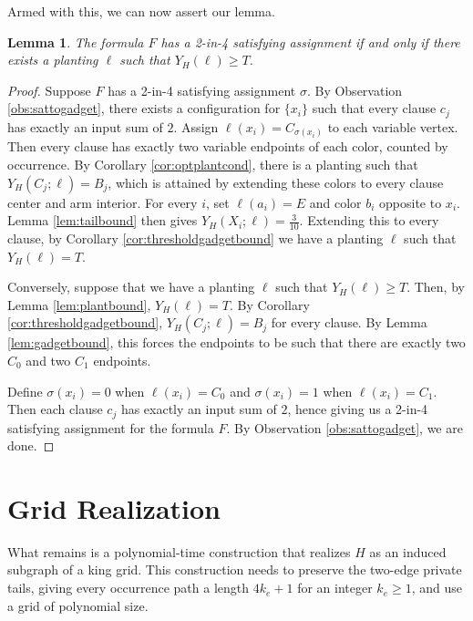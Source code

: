 \documentclass[11pt]{article}
\theoremstyle{plain}
\newtheorem{lemma}[theorem]{Lemma}
\begin{document}
Armed with this, we can now assert our lemma.

\begin{lemma} \label{lem:equivalence}
    The formula $F$ has a 2-in-4 satisfying assignment if and only if there exists a planting $\ell$ such that $Y_H(\ell) \geq T$. 
\end{lemma}

\begin{proof}
    Suppose $F$ has a 2-in-4 satisfying assignment $\sigma$. By Observation \ref{obs:sattogadget}, there exists a configuration for $\{x_i\}$ such that every clause $c_j$ has exactly an input sum of $2$. Assign $\ell(x_i)=C_{\sigma(x_i)}$ to each variable vertex. Then every clause has exactly two variable endpoints of each color, counted by occurrence. By Corollary \ref{cor:optplantcond}, there is a planting such that $Y_H(C_j;\ell)=B_j$, which is attained by extending these colors to every clause center and arm interior. For every $i$, set $\ell(a_i) = E$ and color $b_i$ opposite to $x_i$. Lemma \ref{lem:tailbound} then gives $Y_H(X_i; \ell) = \frac{3}{10}$. Extending this to every clause, by Corollary \ref{cor:thresholdgadgetbound} we have a planting $\ell$ such that $Y_H(\ell) = T$.

    Conversely, suppose that we have a planting $\ell$ such that $Y_H(\ell) \geq T$. Then, by Lemma \ref{lem:plantbound}, $Y_H(\ell) = T$. By Corollary \ref{cor:thresholdgadgetbound}, $Y_H(C_j;\ell)=B_j$ for every clause. By Lemma \ref{lem:gadgetbound}, this forces the endpoints to be such that there are exactly two $C_0$ and two $C_1$ endpoints.

    
    
    Define $\sigma(x_i)=0$ when $\ell(x_i)=C_0$ and $\sigma(x_i)=1$ when $\ell(x_i)=C_1$. Then each clause $c_j$ has exactly an input sum of $2$, hence giving us a 2-in-4 satisfying assignment for the formula $F$. By Observation \ref{obs:sattogadget}, we are done. 
\end{proof}

\section{Grid Realization} \label{sec:gridreal}

What remains is a polynomial-time construction that realizes $H$ as an induced subgraph of a king grid. This construction needs to preserve the two-edge private tails, giving every occurrence path a length $4k_e + 1$ for an integer $k_e \geq 1$, and use a grid of polynomial size.
\end{document}
